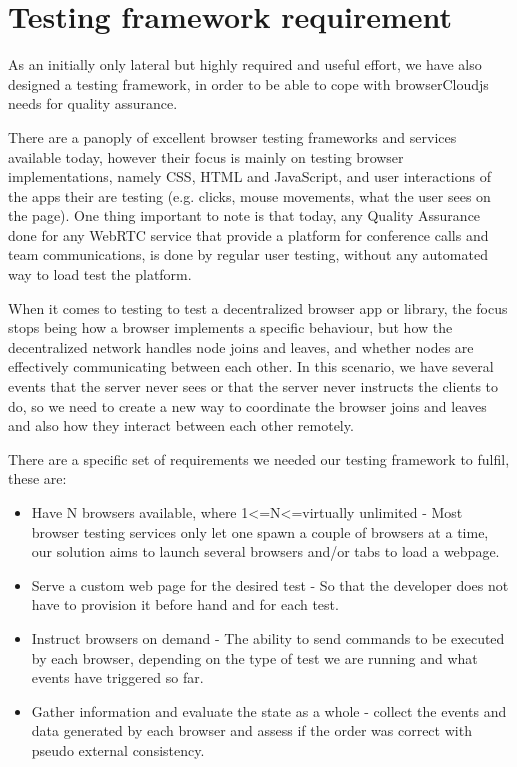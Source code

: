 \section{Testing framework requirement}

As an initially only lateral but highly required and useful effort, we have also designed a testing framework, in order to be able to cope with browserCloudjs needs for quality assurance.

There are a panoply of excellent browser testing frameworks and services available today, however their focus is mainly on testing browser implementations, namely CSS, HTML and JavaScript, and user interactions of the apps their are testing (e.g. clicks, mouse movements, what the user sees on the page). One thing important to note is that today, any Quality Assurance done for any WebRTC service that provide a platform for conference calls and team communications, is done by regular user testing, without any automated way to load test the platform.

When it comes to testing to test a decentralized browser app or library, the focus stops being how a browser implements a specific behaviour, but how the decentralized network handles node joins and leaves, and whether nodes are effectively communicating between each other. In this scenario, we have several events that the server never sees or that the server never instructs the clients to do, so we need to create a new way to coordinate the browser joins and leaves and also how they interact between each other remotely.

There are a specific set of requirements we needed our testing framework to fulfil, these are:

\begin{itemize}
    \item Have N browsers available, where 1\textless=N\textless=virtually unlimited - Most browser testing services only let one spawn a couple of browsers at a time, our solution aims to launch several browsers and/or tabs to load a webpage.
    \item Serve a custom web page for the desired test - So that the developer does not have to provision it before hand and for each test.
    \item Instruct browsers on demand - The ability to send commands to be executed by each browser, depending on the type of test we are running and what events have triggered so far.
    \item Gather information and evaluate the state as a whole - collect the events and data generated by each browser and assess if the order was correct with pseudo external consistency.
\end{itemize}

